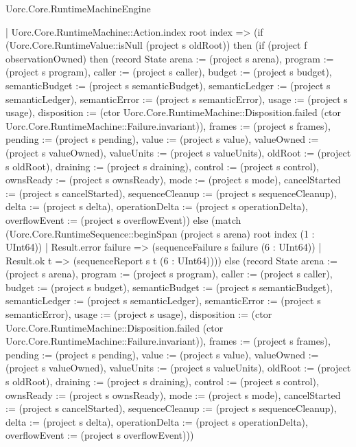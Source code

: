 \begin{lexlean}{Uorc.Core.RuntimeMachineEngine}
\begin{semanticmodule}
{      | Uorc.Core.RuntimeMachine::Action.index root index => (if (Uorc.Core.RuntimeValue::isNull (project s oldRoot)) then (if (project f observationOwned) then (record State {arena := (project s arena), program := (project s program), caller := (project s caller), budget := (project s budget), semanticBudget := (project s semanticBudget), semanticLedger := (project s semanticLedger), semanticError := (project s semanticError), usage := (project s usage), disposition := (ctor Uorc.Core.RuntimeMachine::Disposition.failed (ctor Uorc.Core.RuntimeMachine::Failure.invariant)), frames := (project s frames), pending := (project s pending), value := (project s value), valueOwned := (project s valueOwned), valueUnits := (project s valueUnits), oldRoot := (project s oldRoot), draining := (project s draining), control := (project s control), ownsReady := (project s ownsReady), mode := (project s mode), cancelStarted := (project s cancelStarted), sequenceCleanup := (project s sequenceCleanup), delta := (project s delta), operationDelta := (project s operationDelta), overflowEvent := (project s overflowEvent)}) else (match (Uorc.Core.RuntimeSequence::beginSpan (project s arena) root index (1 : UInt64))
        | Result.error failure => (sequenceFailure s failure (6 : UInt64))
        | Result.ok t => (sequenceReport s t (6 : UInt64)))) else (record State {arena := (project s arena), program := (project s program), caller := (project s caller), budget := (project s budget), semanticBudget := (project s semanticBudget), semanticLedger := (project s semanticLedger), semanticError := (project s semanticError), usage := (project s usage), disposition := (ctor Uorc.Core.RuntimeMachine::Disposition.failed (ctor Uorc.Core.RuntimeMachine::Failure.invariant)), frames := (project s frames), pending := (project s pending), value := (project s value), valueOwned := (project s valueOwned), valueUnits := (project s valueUnits), oldRoot := (project s oldRoot), draining := (project s draining), control := (project s control), ownsReady := (project s ownsReady), mode := (project s mode), cancelStarted := (project s cancelStarted), sequenceCleanup := (project s sequenceCleanup), delta := (project s delta), operationDelta := (project s operationDelta), overflowEvent := (project s overflowEvent)}))
}
\end{semanticmodule}
\end{lexlean}
